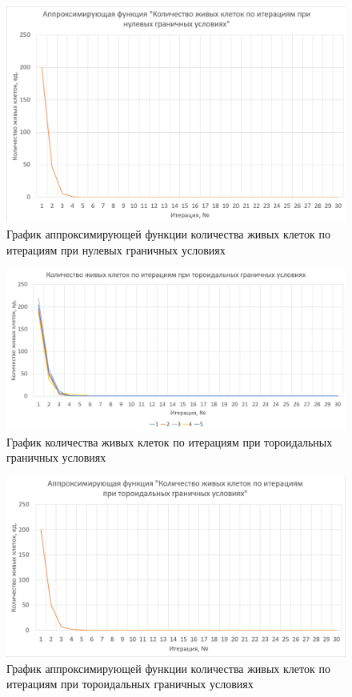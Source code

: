 \documentclass[a4paper, final]{article}
\begin{document}
\begin{figure}[h!]
 \centering
 \includegraphics[width=0.8\linewidth]{approx_zero.png}
 \caption{График аппроксимирующей функции количества живых клеток по итерациям при нулевых граничных условиях}
 \label{img:approx_zero}
\end{figure}

\begin{figure}[h!]
  \centering
  \includegraphics[width=0.8\linewidth]{graph_toroidal.png}
  \caption{График количества живых клеток по итерациям при тороидальных граничных условиях}
  \label{img:graph_toroidal}
\end{figure}

\begin{figure}[h!]
 \centering
 \includegraphics[width=0.8\linewidth]{approx_toroidal.png}
 \caption{График аппроксимирующей функции количества живых клеток по итерациям при тороидальных граничных условиях}
 \label{img:approx_toroidal}
\end{figure}
\end{document}
